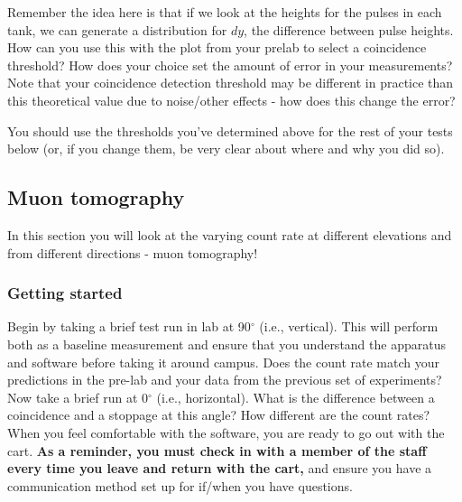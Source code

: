 \documentclass{../lab}
\begin{document}
Remember the idea here is that if we look at the heights for the pulses in each tank, we can generate a distribution for $dy$, the difference between pulse heights. How can you use this with the plot from your prelab to select a coincidence threshold? How does your choice set the amount of error in your measurements? Note that your coincidence detection threshold may be different in practice than this theoretical value due to noise/other effects - how does this change the error? 


You should use the thresholds you've determined above for the rest of your tests below (or, if you change them, be very clear about where and why you did so).

\subsection{Muon tomography}

In this section you will look at the varying count rate at different elevations and from different directions - muon tomography!

\subsubsection{Getting started}

Begin by taking a brief test run in lab at 90$^\circ$ (i.e., vertical). This will perform both as a baseline measurement and ensure that you understand the apparatus and software before taking it around campus. Does the count rate match your predictions in the pre-lab and your data from the previous set of experiments? Now take a brief run at 0$^\circ$ (i.e., horizontal). What is the difference between a coincidence and a stoppage at this angle? How different are the count rates? When you feel comfortable with the software, you are ready to go out with the cart. \textbf{As a reminder, you must check in with a member of the staff every time you leave and return with the cart,} and ensure you have a communication method set up for if/when you have questions.

\end{document}
